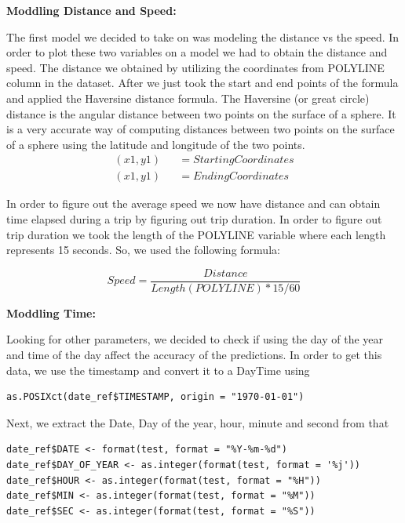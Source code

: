 \documentclass[11pt]{article}
\begin{document}
\textbf{Moddling Distance and Speed:}
\par
The first model we decided to take on was modeling the distance vs the 
speed. In order to plot these two variables on a model we had to obtain 
the distance and speed. The distance we obtained by utilizing the 
coordinates from POLYLINE column in the dataset. After we just took the 
start and end points of the formula and applied the Haversine distance 
formula. The Haversine (or great circle) distance is the angular distance 
between two points on the surface of a sphere. It is a very accurate way 
of computing distances between two points on the surface of a sphere using 
the latitude and longitude of the two points.
\begin{equation*}
	\begin{aligned}
		(x1,y1) &&= Starting Coordinates\\
		(x1,y1) &&=Ending Coordinates
	\end{aligned}
\end{equation*}

\par
In order to figure out the average speed we now have distance and can obtain time elapsed during a trip by figuring out trip duration. In order to figure out trip duration we took the length of the POLYLINE variable where each length represents 15 seconds. So, we used the following formula:

\begin{equation*}
	Speed = \frac{Distance} {Length(POLYLINE) * 15 / 60}
\end{equation*}

\textbf{Moddling Time:}
\par
Looking for other parameters, we decided to check if using the day of the year and time of the day affect the accuracy of the predictions. In order to get this data, we use the timestamp and convert it to a DayTime using

\begin{lstlisting}
as.POSIXct(date_ref$TIMESTAMP, origin = "1970-01-01")
\end{lstlisting}
\par
Next, we extract the Date, Day of the year, hour, minute and second from that
\begin{lstlisting}
date_ref$DATE <- format(test, format = "%Y-%m-%d")
date_ref$DAY_OF_YEAR <- as.integer(format(test, format = '%j'))
date_ref$HOUR <- as.integer(format(test, format = "%H"))
date_ref$MIN <- as.integer(format(test, format = "%M"))
date_ref$SEC <- as.integer(format(test, format = "%S"))
\end{lstlisting}
\end{document}
